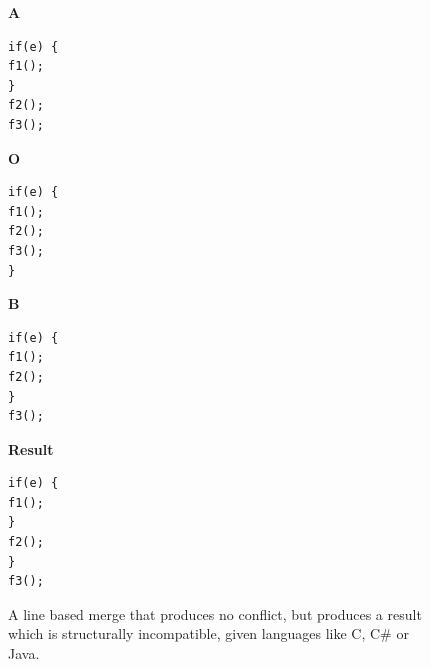 \documentclass[11pt]{article}
\begin{document}
\begin{figure}

\begin{multicols*}{4}

\textbf{A}


\begin{lstlisting}[language=CSharp]
if(e) {
f1();
}
f2();
f3();

\end{lstlisting}

\columnbreak

\textbf{O}

\begin{lstlisting}[language=CSharp]
if(e) {
f1();
f2();
f3();
}

\end{lstlisting}

\columnbreak

\textbf{B}
 
\begin{lstlisting}[language=CSharp]
if(e) {
f1();
f2();
}
f3();

\end{lstlisting}

\columnbreak

\textbf{Result}
 
\begin{lstlisting}[language=CSharp]
if(e) {
f1();
}
f2();
}
f3();
\end{lstlisting}
\end{multicols*}
\caption{A line based merge that produces no conflict, but produces a result which is structurally incompatible, given languages like C, C\# or Java.}
\label{WrongMergeFromLineBasedApproach2}

\end{figure}
\end{document}
